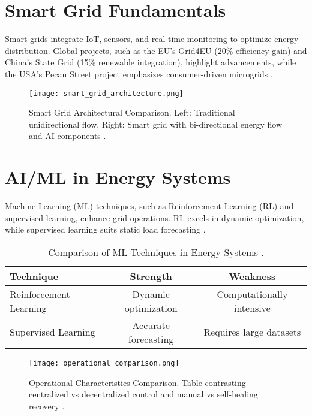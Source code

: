 \documentclass[12pt]{report}
\begin{document}
\section{Smart Grid Fundamentals}
\begin{doublespace}
Smart grids integrate IoT, sensors, and real-time monitoring to optimize energy distribution. Global projects, such as the EU's Grid4EU (20\% efficiency gain) and China's State Grid (15\% renewable integration), highlight advancements, while the USA's Pecan Street project emphasizes consumer-driven microgrids \cite{Grid4EU2020, PecanStreet2021}.
\end{doublespace}
\begin{figure}[h]
    \centering
    \texttt{[image: smart\_grid\_architecture.png]}
    \caption{Smart Grid Architectural Comparison. Left: Traditional unidirectional flow. Right: Smart grid with bi-directional energy flow and AI components \cite{SmartGrid2021}.}
    \label{fig:smart_grid_architecture}
\end{figure}

\section{AI/ML in Energy Systems}
\begin{doublespace}
Machine Learning (ML) techniques, such as Reinforcement Learning (RL) and supervised learning, enhance grid operations. RL excels in dynamic optimization, while supervised learning suits static load forecasting \cite{Zhou2021}.
\end{doublespace}
\begin{table}[h]
    \centering
    \caption{Comparison of ML Techniques in Energy Systems \cite{Zhou2021}.}
    \label{tab:ml_comparison}
    \begin{tabular}{lcc}
        \toprule
        \textbf{Technique} & \textbf{Strength} & \textbf{Weakness} \\
        \midrule
        Reinforcement Learning & Dynamic optimization & Computationally intensive \\
        Supervised Learning & Accurate forecasting & Requires large datasets \\
        \bottomrule
    \end{tabular}
\end{table}
\begin{figure}[h]
    \centering
    \texttt{[image: operational\_comparison.png]}
    \caption{Operational Characteristics Comparison. Table contrasting centralized vs decentralized control and manual vs self-healing recovery \cite{SmartGrid2021}.}
    \label{fig:operational_comparison}
\end{figure}
\end{document}
